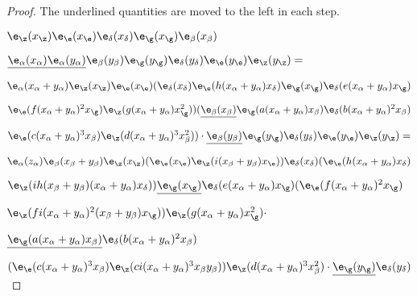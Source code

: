 \documentclass{memo-l}
\theoremstyle{definition}
\theoremstyle{remark}
\numberwithin{section}{chapter}
\numberwithin{equation}{chapter}
\begin{document}
\begin{proof}    The underlined quantities are moved to the left in each step.

${\e}_{{\z}}(x_{{\z}}){\e}_{{\e}}(x_{{\e}})
{\e}_{{\delta}}(x_{{\delta}}){\e}_{{\g}}(x_{{\g}})
{\e}_{\beta}(x_{\beta})$

$
{\underline{{\e}_{\alpha}(x_{\alpha}){\e}_{\alpha}(y_{\alpha})}} 
{\e}_{\beta}(y_{\beta})
{\e}_{{\g}}(y_{{\g}}){\e}_{{\delta}}(y_{{\delta}})
{\e}_{{\e}}(y_{{\e}}){\e}_{{\z}}(y_{{\z}})=$

\medpagebreak									     

${\e}_{\alpha}({ {x_{\alpha}+y_{\alpha}}}){\e}_{{\z}}
(x_{{\z}}){\e}_{{\e}}(x_{{\e}})
{ (}{\e}_{{\delta}}(x_{{\delta}}){\e}_{{\e}}
(h(x_{\alpha}+y_{\alpha})x_{{\delta}}){\e}_{{\g}}
(x_{{\g}}){\e}_{{\delta}}(e(x_{\alpha}+y_{\alpha})x_\g)$

${\e}_{{\e}}(f(x_{\alpha}+y_{\alpha})^{2}x_{{\g}})
{\e}_{{\z}}(g(x_{\alpha}+y_{\alpha})x_{{\g}}^{2}))
({\underline{{\e}_{\beta}(x_{\beta})}} 
{\e}_{{\g}}(a(x_{\alpha}
+y_{\alpha})x_{\beta}){\e}_{{\delta}}(b(x_{\alpha}+
y_{\alpha})^{2}x_{\beta})$

${\e}_{{\e}}(c(x_{\alpha}+y_{\alpha})^{3}x_{\beta})
{\e}_{{\z}}(d(x_{\alpha}+y_{\alpha})^{3}x_{\beta}^{2}))\cdot
{\underline{{\e}_{\beta}(y_{\beta})}} {\e}_{{\g}}
(y_{{\g}}){\e}_{{\delta}}(y_{{\delta}}){\e}_{{\e}}
(y_{{\e}}){\e}_{{\z}}(y_{{\z}}) =$

\medpagebreak

${\e}_{\alpha}(z_{\alpha}){\e}_{\beta}({ x_{\beta}+
y_{\beta}}){\e}_{{\z}}(x_{{\z}}){ (}{\e}_{{\e}}
(x_{{\e}}){\e}_{{\z}}(i(x_{\beta}+y_{\beta})x_{{\e}})
{ )}{\e}_{{\delta}}(x_{{\delta}}){ (}{\e}_{{\e}}
(h(x_{\alpha}+y_{\alpha})x_\delta)$

$\e_\z(ih(x_\beta+y_\beta)(x_\alpha+y_\alpha)
x_{{\delta}})){\underline{{\e}_{{\g}}(x_{{\g}})}} 
{\e}_{{\delta}} (e(x_{\alpha}+y_{\alpha})x_{{\g}})
({\e}_{{\e}}(f(x_{\alpha}+y_{\alpha})^{2}x_{{\g}})$

${\e}_{{\z}}(fi(x_{\alpha}+y_{\alpha})^{2}(x_{\beta}+y_{\beta})
x_{{\g}}) { ) }{\e}_{{\z}}(g(x_{\alpha}+y_{\alpha})
x_{{\g}}^{2}) \cdot $

$
{\underline{{\e}_{{\g}}(a(x_{\alpha}+y_{\alpha})x_{\beta})}} 
{\e}_{{\delta}}(b(x_{\alpha}+y_{\alpha})^{2}x_{\beta})$

$({\e}_{{\e}}(c(x_{\alpha}+y_{\alpha})^{3}x_{\beta})
{\e}_{{\z}}(ci(x_{\alpha}+y_{\alpha})^{3}x_{\beta}y_{\beta})
{ )}{\e}_{{\z}}(d(x_{\alpha}+y_{\alpha})^{3}x_{\beta}^{2})
\cdot {\underline{{\e}_{{\g}}(y_{{\g}})}} 
{\e}_{{\delta}}(y_{{\delta}})$


\end{proof}
\end{document}
